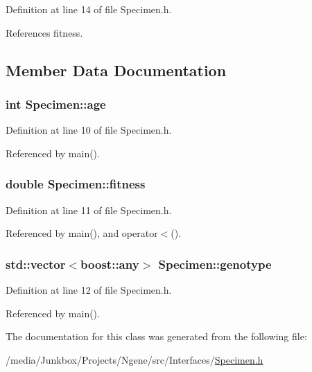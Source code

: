 Definition at line 14 of file Specimen.h.

References fitness.

\subsection{Member Data Documentation}
\hypertarget{classSpecimen_c28f8751b5461503dab079df3c9c2121}{
\subsubsection{\setlength{\rightskip}{0pt plus 5cm}int {\bf Specimen::age}}}
\label{classSpecimen_c28f8751b5461503dab079df3c9c2121}




Definition at line 10 of file Specimen.h.

Referenced by main().\hypertarget{classSpecimen_14e1eefd003e8a43a6a1c743dfb5f638}{
\subsubsection{\setlength{\rightskip}{0pt plus 5cm}double {\bf Specimen::fitness}}}
\label{classSpecimen_14e1eefd003e8a43a6a1c743dfb5f638}




Definition at line 11 of file Specimen.h.

Referenced by main(), and operator$<$().\hypertarget{classSpecimen_3c799f53873aa03836c0650338099fbe}{
\subsubsection{\setlength{\rightskip}{0pt plus 5cm}std::vector$<$boost::any$>$ {\bf Specimen::genotype}}}
\label{classSpecimen_3c799f53873aa03836c0650338099fbe}




Definition at line 12 of file Specimen.h.

Referenced by main().

The documentation for this class was generated from the following file:\begin{CompactItemize}
\item 
/media/Junkbox/Projects/Ngene/src/Interfaces/\hyperlink{Specimen_8h}{Specimen.h}\end{CompactItemize}
